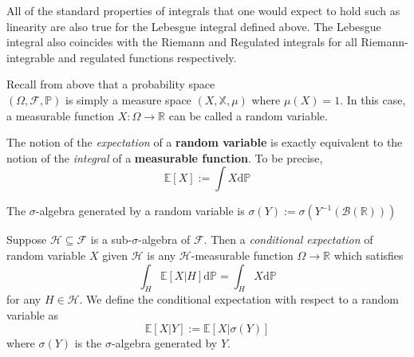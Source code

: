 \begin{remark}
    All of the standard properties of integrals that one would expect
    to hold such as linearity are also true for the Lebesgue integral 
    defined above. The Lebesgue integral also coincides with the Riemann
    and Regulated integrals for all Riemann-integrable and regulated functions respectively.
\end{remark}

\begin{definition}
    Recall from above that a probability space \\$(\Omega,\mathcal{F},\mathbb{P})$
    is simply a measure space $(X,\mathbb{X},\mu)$ where $\mu(X)=1.$ In this case,
    a measurable function $X:\Omega\rightarrow\mathbb{R}$ can be called
    a random variable. 
\end{definition}

\begin{definition}[Expectation]
    The notion of the \emph{expectation} of a \textbf{random variable} is exactly equivalent
    to the notion of the \emph{integral} of a \textbf{measurable function}.
    To be precise,
    \begin{equation}
        \mathbb{E}[X]:=\int X\mathrm d\mathbb{P}
    \end{equation}
\end{definition}

\begin{definition}
    The $\sigma$-algebra generated by a random variable is
    $\sigma(Y):=\sigma(Y^{-1}(\mathcal{B}(\mathbb{R})))$
\end{definition}

\begin{definition}
    Suppose $\mathcal{H}\subseteq\mathcal{F}$ is a sub-$\sigma$-algebra
    of $\mathcal{F}.$ Then a \emph{conditional expectation} of random variable
    $X$ given $\mathcal{H}$ is any $\mathcal{H}$-measurable function $\Omega\rightarrow\mathbb{R}$
    which satisfies
    \begin{equation}
        \int_H \mathbb{E}[X|H]\mathrm d\mathbb{P}=\int_H X\mathrm d\mathbb{P}
    \end{equation}
    for any $H\in\mathcal{H}$. We define the conditional expectation with respect
    to a random variable as 
    \begin{equation}
        \mathbb{E}[X|Y]:=\mathbb{E}[X|\sigma(Y)]
    \end{equation}
    where $\sigma(Y)$ is the $\sigma$-algebra generated by $Y$.
\end{definition}

